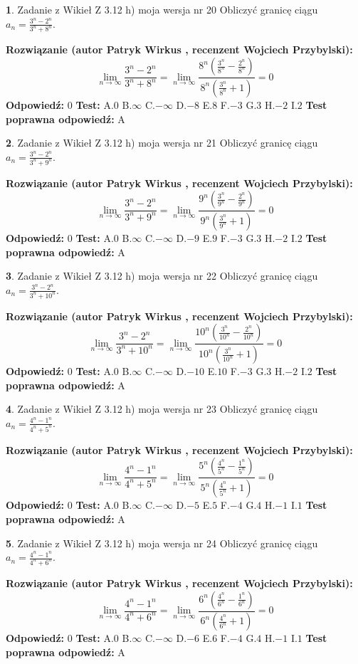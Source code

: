 \documentclass[12pt, a4paper]{article}
\theoremstyle{definition} %
\newtheorem{zad}{}
\newcommand{\zadStart}[1]{\begin{zad}#1\newline}
\newcommand{\zadStop}{\end{zad}}
\newcommand{\rozwStart}[2]{\noindent \textbf{Rozwiązanie (autor #1 , recenzent #2): }\newline}
\newcommand{\rozwStop}{\newline}
\newcommand{\odpStart}{\noindent \textbf{Odpowiedź:}\newline}
\newcommand{\odpStop}{\newline}
\newcommand{\testStart}{\noindent \textbf{Test:}\newline}
\newcommand{\testStop}{\newline}
\newcommand{\kluczStart}{\noindent \textbf{Test poprawna odpowiedź:}\newline}
\newcommand{\kluczStop}{\newline}
\begin{document}
\zadStart{Zadanie z Wikieł Z 3.12 h) moja wersja nr 20}
Obliczyć granicę ciągu $a_{n}=\frac{3^{n} - 2^{n}}{3^{n} + 8^{n}}$.
\zadStop
\rozwStart{Patryk Wirkus}{Wojciech Przybylski}
$$\lim\limits_{n\to\infty}\frac{3^{n} - 2^{n}}{3^{n} + 8^{n}} = \lim\limits_{n\to\infty}\frac{8^{n}(\frac{3^{n}}{8^{n}} - \frac{2^{n}}{8^{n}})}{8^{n}(\frac{3^{n}}{8^{n}} + 1)} = 0$$
\rozwStop
\odpStart
$0$
\odpStop
\testStart
A.$0$
B.$\infty$
C.$-\infty$
D.$-8$
E.$8$
F.$-3$
G.$3$
H.$-2$
I.$2$
\testStop
\kluczStart
A
\kluczStop



\zadStart{Zadanie z Wikieł Z 3.12 h) moja wersja nr 21}
Obliczyć granicę ciągu $a_{n}=\frac{3^{n} - 2^{n}}{3^{n} + 9^{n}}$.
\zadStop
\rozwStart{Patryk Wirkus}{Wojciech Przybylski}
$$\lim\limits_{n\to\infty}\frac{3^{n} - 2^{n}}{3^{n} + 9^{n}} = \lim\limits_{n\to\infty}\frac{9^{n}(\frac{3^{n}}{9^{n}} - \frac{2^{n}}{9^{n}})}{9^{n}(\frac{3^{n}}{9^{n}} + 1)} = 0$$
\rozwStop
\odpStart
$0$
\odpStop
\testStart
A.$0$
B.$\infty$
C.$-\infty$
D.$-9$
E.$9$
F.$-3$
G.$3$
H.$-2$
I.$2$
\testStop
\kluczStart
A
\kluczStop



\zadStart{Zadanie z Wikieł Z 3.12 h) moja wersja nr 22}
Obliczyć granicę ciągu $a_{n}=\frac{3^{n} - 2^{n}}{3^{n} + 10^{n}}$.
\zadStop
\rozwStart{Patryk Wirkus}{Wojciech Przybylski}
$$\lim\limits_{n\to\infty}\frac{3^{n} - 2^{n}}{3^{n} + 10^{n}} = \lim\limits_{n\to\infty}\frac{10^{n}(\frac{3^{n}}{10^{n}} - \frac{2^{n}}{10^{n}})}{10^{n}(\frac{3^{n}}{10^{n}} + 1)} = 0$$
\rozwStop
\odpStart
$0$
\odpStop
\testStart
A.$0$
B.$\infty$
C.$-\infty$
D.$-10$
E.$10$
F.$-3$
G.$3$
H.$-2$
I.$2$
\testStop
\kluczStart
A
\kluczStop



\zadStart{Zadanie z Wikieł Z 3.12 h) moja wersja nr 23}
Obliczyć granicę ciągu $a_{n}=\frac{4^{n} - 1^{n}}{4^{n} + 5^{n}}$.
\zadStop
\rozwStart{Patryk Wirkus}{Wojciech Przybylski}
$$\lim\limits_{n\to\infty}\frac{4^{n} - 1^{n}}{4^{n} + 5^{n}} = \lim\limits_{n\to\infty}\frac{5^{n}(\frac{4^{n}}{5^{n}} - \frac{1^{n}}{5^{n}})}{5^{n}(\frac{4^{n}}{5^{n}} + 1)} = 0$$
\rozwStop
\odpStart
$0$
\odpStop
\testStart
A.$0$
B.$\infty$
C.$-\infty$
D.$-5$
E.$5$
F.$-4$
G.$4$
H.$-1$
I.$1$
\testStop
\kluczStart
A
\kluczStop



\zadStart{Zadanie z Wikieł Z 3.12 h) moja wersja nr 24}
Obliczyć granicę ciągu $a_{n}=\frac{4^{n} - 1^{n}}{4^{n} + 6^{n}}$.
\zadStop
\rozwStart{Patryk Wirkus}{Wojciech Przybylski}
$$\lim\limits_{n\to\infty}\frac{4^{n} - 1^{n}}{4^{n} + 6^{n}} = \lim\limits_{n\to\infty}\frac{6^{n}(\frac{4^{n}}{6^{n}} - \frac{1^{n}}{6^{n}})}{6^{n}(\frac{4^{n}}{6^{n}} + 1)} = 0$$
\rozwStop
\odpStart
$0$
\odpStop
\testStart
A.$0$
B.$\infty$
C.$-\infty$
D.$-6$
E.$6$
F.$-4$
G.$4$
H.$-1$
I.$1$
\testStop
\kluczStart
A
\kluczStop
\end{document}
